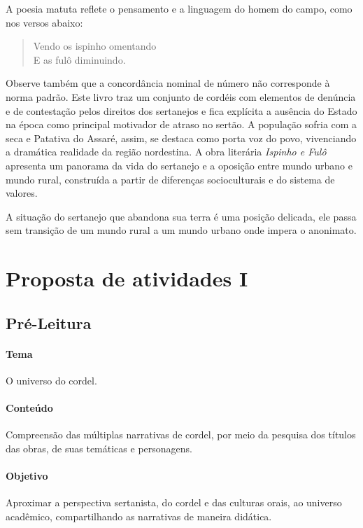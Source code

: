 \documentclass[12pt]{extarticle}
\begin{document}
{A poesia matuta reflete o pensamento e a linguagem do homem do campo, 
como nos versos abaixo:  

\begin{verse}
Vendo os ispinho omentando\\
E as fulô diminuindo.\\
\end{verse}
 
Observe também que a concordância nominal de número não corresponde à 
norma padrão. 
Este livro traz um conjunto de cordéis com elementos de denúncia e de 
contestação pelos direitos dos sertanejos e fica explícita a ausência 
do Estado na época como principal motivador de atraso no sertão. A 
população sofria com a seca e Patativa do Assaré, assim, se destaca como 
porta voz do povo, vivenciando a dramática realidade da região nordestina. 
A obra literária \emph{Ispinho e Fulô} apresenta um panorama da vida do 
sertanejo e a oposição entre mundo urbano e mundo rural, construída a 
partir de diferenças socioculturais e do sistema de valores. 
 
A situação do sertanejo que abandona sua terra é uma posição delicada, 
ele passa sem transição de um mundo rural a um mundo urbano onde 
impera o anonimato. 

\section{Proposta de atividades I}

\subsection{Pré-Leitura}

\paragraph{Tema} O universo do cordel.

\paragraph{Conteúdo} Compreensão das múltiplas narrativas de cordel, por 
meio da pesquisa dos títulos das obras, de suas temáticas e personagens. 

\paragraph{Objetivo} Aproximar a perspectiva sertanista, do cordel e das 
culturas orais, ao universo acadêmico, compartilhando as narrativas de 
maneira didática.

}
\end{document}
